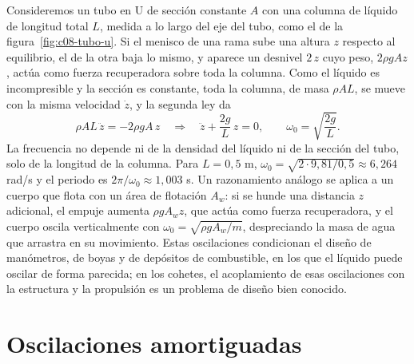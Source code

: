 \documentclass[10pt,openany]{book}
\begin{document}
Consideremos un tubo en U de sección constante \(A\) con una columna de líquido de longitud total \(L\), medida a lo largo del eje del tubo, como el de la figura~\ref{fig:c08-tubo-u}. Si el menisco de una rama sube una altura \(z\) respecto al equilibrio, el de la otra baja lo mismo, y aparece un desnivel \(2\,z\) cuyo peso, \(2\rho g A z\), actúa como fuerza recuperadora sobre toda la columna. Como el líquido es incompresible y la sección es constante, toda la columna, de masa \(\rho A L\), se mueve con la misma velocidad \(\dot z\), y la segunda ley da
\begin{equation}
\rho A L\,\ddot z = -2\rho g A\,z \quad\Rightarrow\quad \ddot z + \frac{2g}{L}\,z = 0, \qquad \omega_0 = \sqrt{\frac{2g}{L}}. \label{eq:c08-tubo-u}
\end{equation}
La frecuencia no depende ni de la densidad del líquido ni de la sección del tubo, solo de la longitud de la columna. Para \(L = 0{,}5\) m, \(\omega_0 = \sqrt{2\cdot 9{,}81/0{,}5} \approx 6{,}264\) rad/s y el periodo es \(2\pi/\omega_0 \approx 1{,}003\) s. Un razonamiento análogo se aplica a un cuerpo que flota con un área de flotación \(A_w\): si se hunde una distancia \(z\) adicional, el empuje aumenta \(\rho g A_w z\), que actúa como fuerza recuperadora, y el cuerpo oscila verticalmente con \(\omega_0 = \sqrt{\rho g A_w/m}\), despreciando la masa de agua que arrastra en su movimiento. Estas oscilaciones condicionan el diseño de manómetros, de boyas y de depósitos de combustible, en los que el líquido puede oscilar de forma parecida; en los cohetes, el acoplamiento de esas oscilaciones con la estructura y la propulsión es un problema de diseño bien conocido.

\section{Oscilaciones amortiguadas}
\end{document}
